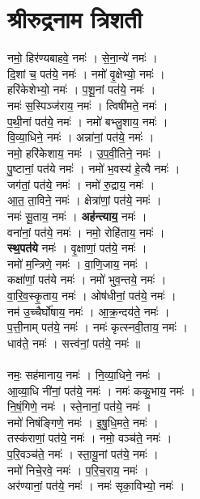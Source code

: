 \section{श्रीरुद्रनाम त्रिशती}
नमो॒ हिर॑ण्यबाहवे॒ नमः॑ । से॒ना॒न्ये॑  नमः॑ ।\\
दि॒शां च॒ पत॑ये॒ नमः॑ । नमो॑ वृ॒क्षेभ्यो॒ नमः॑ ।\\
हरि॑केशेभ्यो॒  नमः॑ । प॒शू॒नां पत॑ये॒  नमः॑ ।\\
नमः॑ स॒स्पिञ्ज॑राय॒ नमः॑ । त्विषी॑मते॒ नमः॑ ।\\
प॒थी॒नां पत॑ये॒ नमः॑ । नमो॑ बभ्लु॒शाय॒ नमः॑ ।\\
वि॒व्या॒धिने॒ नमः॑ । अन्ना॑नां॒ पत॑ये॒ नमः॑ ।\\
नमो॒ हरि॑केशाय॒ नमः॑ । उ॒प॒वी॒तिने॒ नमः॑ ।\\
पु॒ष्टानां॒ पत॑ये नमः॑ । नमो॑ भ॒वस्य॑ हे॒त्यै नमः॑ ।\\
जग॑तां॒ पत॑ये॒ नमः॑ । नमो॑ रु॒द्राय॒ नमः॑ ।\\
आ॒त॒ ता॒विने॒ नमः॑ । क्षेत्रा॑णां॒ पत॑ये॒ नमः॑ ।\\
नमः॑ सू॒ताय॒ नमः॑ । \textbf{अह॑न्त्याय॒} नमः॑ ।\\
वना॑नां॒  पत॑ये॒ नमः॑ । नमो॒ रोहि॑ताय॒ नमः॑ ।\\
\textbf{स्थ॒पत॑ये} नमः॑ । वृ॒क्षाणां॒ पत॑ये॒ नमः॑ ।\\
नमो॑ म॒न्त्रिणे॒ नमः॑ । वा॒णि॒जाय॒ नमः॑ ।\\
कक्षा॑णां॒ पत॑ये नमः॑ । नमो॑ भुव॒न्तये॒ नमः॑ ।\\
वा॒रि॒व॒स्कृ॒ताय॒ नमः॑ । ओष॑धीनां॒ पत॑ये॒ नमः॑ ।\\
नम॑ उ॒च्चैर्घो॑षाय॒ नमः॑ । आ॒क्र॒न्दय॑ते॒ नमः॑ ।\\
प॒त्ती॒नाम् पत॑ये॒ नमः॑ । नमः॑ कृत्स्नवी॒ताय॒ नमः॑ ।\\
धाव॑ते॒ नमः॑ । सत्त्व॑नां॒ पत॑ये॒ नमः॑ ॥\\
\\
नमः॒ सह॑मानाय॒ नमः॑ । नि॒व्या॒धिने॒ नमः॑ ।\\
आ॒व्या॒धि नी॑नां॒ पत॑ये॒ नमः॑ । नमः॑ ककु॒भाय॒ नमः॑ ।\\
नि॒षं॒गिणे॒ नमः॑ । स्ते॒नानां॒ पत॑ये॒ नमः॑ ।\\
नमो॑ निषंङ्गिणे॒ नमः॑ । इ॒षु॒धि॒मते॒ नमः॑ ।\\
तस्क॑राणां॒ पत॑ये॒ नमः॑ । नमो॒ वञ्च॑ते॒ नमः॑ ।\\
प॒रि॒वञ्च॑ते॒ नमः॑ । स्ता॒यू॒नां पत॑ये॒ नमः॑ ।\\
नमो॑ निचे॒रवे॒ नमः॑ । प॒रि॒च॒राय॒ नमः॑ ।\\
अर॑ण्यानां॒ पत॑ये॒ नमः॑ । नमः॑ सृका॒विभ्यो॒ नमः॑ ।\\
